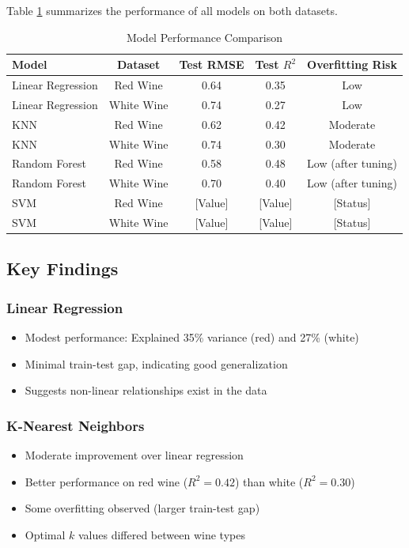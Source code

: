\documentclass[12pt]{article}
\begin{document}
Table \ref{tab:results} summarizes the performance of all models on both datasets.

\begin{table}[H]
\centering
\caption{Model Performance Comparison}
\label{tab:results}
\begin{tabular}{lcccc}
\toprule
\textbf{Model} & \textbf{Dataset} & \textbf{Test RMSE} & \textbf{Test $R^2$} & \textbf{Overfitting Risk} \\
\midrule
Linear Regression & Red Wine & 0.64 & 0.35 & Low \\
Linear Regression & White Wine & 0.74 & 0.27 & Low \\
KNN & Red Wine & 0.62 & 0.42 & Moderate \\
KNN & White Wine & 0.74 & 0.30 & Moderate \\
Random Forest & Red Wine & 0.58 & 0.48 & Low (after tuning) \\
Random Forest & White Wine & 0.70 & 0.40 & Low (after tuning) \\
SVM & Red Wine & [Value] & [Value] & [Status] \\
SVM & White Wine & [Value] & [Value] & [Status] \\
\bottomrule
\end{tabular}
\end{table}

\subsection{Key Findings}

\subsubsection{Linear Regression}
\begin{itemize}
    \item Modest performance: Explained 35\% variance (red) and 27\% (white)
    \item Minimal train-test gap, indicating good generalization
    \item Suggests non-linear relationships exist in the data
\end{itemize}

\subsubsection{K-Nearest Neighbors}
\begin{itemize}
    \item Moderate improvement over linear regression
    \item Better performance on red wine ($R^2 = 0.42$) than white ($R^2 = 0.30$)
    \item Some overfitting observed (larger train-test gap)
    \item Optimal $k$ values differed between wine types
\end{itemize}
\end{document}
